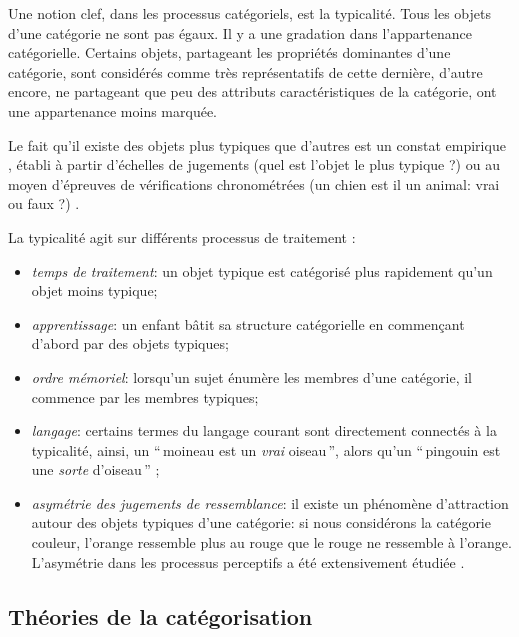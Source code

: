 Une notion clef, dans les processus catégoriels, est la typicalité. Tous les objets d'une catégorie ne sont pas égaux. Il y a une gradation dans l'appartenance catégorielle. Certains objets, partageant les propriétés dominantes d'une catégorie, sont considérés comme très représentatifs de cette dernière, d'autre encore, ne partageant que peu des attributs caractéristiques de la catégorie, ont une appartenance moins marquée.

Le fait qu'il existe des objets plus typiques que d'autres est un constat empirique \citep[p. 37]{rosch1978cognition,mervis1981categorization}, établi à partir d'échelles de jugements (quel est l'objet le plus typique ?) ou au moyen d'épreuves de vérifications chronométrées (un chien est il un animal: vrai ou faux ?) \citep[p. 41]{dubois1991semantique}.

La typicalité agit sur différents processus de traitement \citep[p. 51]{Houix03f,mervis1981categorization}:

\begin{itemize}
\item \emph{temps de traitement}: un objet typique est catégorisé plus rapidement qu'un objet moins typique;
\item \emph{apprentissage}: un enfant bâtit sa structure catégorielle en commençant d'abord par des objets typiques;
\item \emph{ordre mémoriel}: lorsqu'un sujet énumère les membres d'une catégorie, il commence par les membres typiques;
\item \emph{langage}: certains termes du langage courant sont directement connectés à la typicalité, ainsi, un ``\,moineau est un \emph{vrai} oiseau\,'', alors qu'un ``\,pingouin est une \emph{sorte} d'oiseau\,'' \citep{mervis1981categorization};
\item \emph{asymétrie des jugements de ressemblance}: il existe un phénomène d'attraction autour des objets typiques d'une catégorie: si nous considérons la catégorie couleur, l’orange ressemble plus au rouge que le rouge ne ressemble à l'orange. L'asymétrie dans les processus perceptifs a été extensivement étudiée \citep{tversky1977features,krumhansl1978concerning}.
\end{itemize}


\subsection{Théories de la catégorisation}

